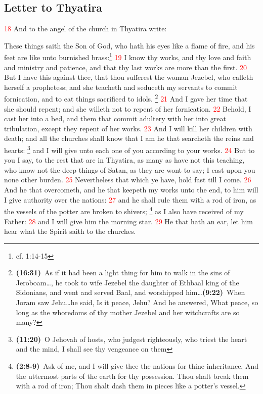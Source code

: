 \documentclass[12pt,twoside]{memoir}
\newcommand{\cbibleref}[3]{\textbf{\ibibleverse{#1}(#2)}\ {#3}}
\newcommand{\cbiblefoot}[3]{\footnote{\cbibleref{#1}{#2}{#3}}}
\newcommand{\cbiblefootduo}[6]{\footnote{\cbibleref{#1}{#2}{#3}\ldots \cbibleref{#4}{#5}{#6}}}
\newcommand{\vnum}[1]{\textcolor{red}{\normalsize{#1}}}
\begin{document}
\subsection*{Letter to Thyatira}
\vnum{18} And to the angel of the church in Thyatira write:

These things saith the Son of God, who hath his eyes like a flame of fire, and his feet are like unto burnished brass:\footnote{cf. 1:14-15} %
\vnum{19} I know thy works, and thy love and faith and ministry and patience, and that thy last works are more than the first. %
\vnum{20} But I have this against thee, that thou sufferest the woman Jezebel, who calleth herself a prophetess; and she teacheth and seduceth my servants to commit fornication, and to eat things sacrificed to idols.%
	\cbiblefootduo{IKings}{16:31}{As if it had been a light thing for him to walk in the sins of Jeroboam\ldots, he took to wife Jezebel the daughter of Ethbaal king of the Sidonians, and went and served Baal, and worshipped him}%
				 {IIKings}{9:22}{When Joram saw Jehu\ldots he said, Is it peace, Jehu? And he answered, What peace, so long as the whoredoms of thy mother Jezebel and her witchcrafts are so many?}
\vnum{21} And I gave her time that she should repent; and she willeth not to repent of her fornication. %
\vnum{22} Behold, I cast her into a bed, and them that commit adultery with her into great tribulation, except they repent of her works. %
\vnum{23} And I will kill her children with death; and all the churches shall know that I am he that searcheth the reins and hearts:%
	\cbiblefoot{Jeremiah}{11:20}{O Jehovah of hosts, who judgest righteously, who triest the heart and the mind, I shall see thy vengeance on them}
 and I will give unto each one of you according to your works. %
\vnum{24} But to you I say, to the rest that are in Thyatira, as many as have not this teaching, who know not the deep things of Satan, as they are wont to say; I cast upon you none other burden. %
\vnum{25} Nevertheless that which ye have, hold fast till I come. %
\vnum{26} And he that overcometh, and he that keepeth my works unto the end, to him will I give authority over the nations: %
\vnum{27} and he shall rule them with a rod of iron, as the vessels of the potter are broken to shivers;%
	\cbiblefoot{Psalms}{2:8-9}{Ask of me, and I will give thee the nations for thine inheritance, And the uttermost parts of the earth for thy possession. Thou shalt break them with a rod of iron; Thou shalt dash them in pieces like a potter’s vessel.}
 as I also have received of my Father: %
\vnum{28} and I will give him the morning star. %
\vnum{29} He that hath an ear, let him hear what the Spirit saith to the churches.
\end{document}
